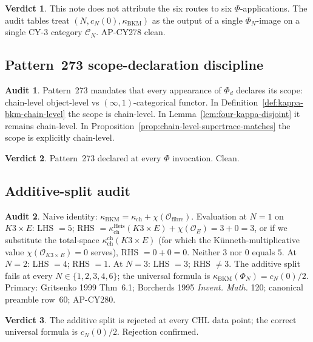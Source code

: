 \documentclass[11pt]{article}
\providecommand{\kBKM}{\kappa_{\mathrm{BKM}}}
\providecommand{\kch}{\kappa_{\mathrm{ch}}}
\theoremstyle{definition}
\newtheorem*{audit}{Audit}
\newtheorem*{verdict}{Verdict}
\begin{document}
\begin{verdict}
This note does not attribute the six routes to six $\Phi$-applications.
The audit tables treat $(N, c_N(0), \kBKM)$ as the output of a single
$\Phi_N$-image on a single CY-3 category $\mathcal C_N$.
AP-CY278 clean.
\end{verdict}

\subsection{Pattern~273 scope-declaration discipline}

\begin{audit}
Pattern~273 mandates that every appearance of $\Phi_d$ declares its
scope: chain-level object-level vs $(\infty,1)$-categorical functor.
In Definition~\ref{def:kappa-bkm-chain-level} the scope is
chain-level. In Lemma~\ref{lem:four-kappa-disjoint} it remains
chain-level. In Proposition~\ref{prop:chain-level-supertrace-matches}
the scope is explicitly chain-level.
\end{audit}

\begin{verdict}
Pattern~273 declared at every $\Phi$ invocation. Clean.
\end{verdict}

\subsection{Additive-split audit}
\label{sec:additive-split-audit}

\begin{audit}
Naive identity: $\kBKM = \kch + \chi(\mathcal O_{\mathrm{fibre}})$.
Evaluation at $N = 1$ on $K3 \times E$:
LHS $= 5$; RHS $= \kch^{\mathrm{Heis}}(K3 \times E) + \chi(\mathcal O_E)
= 3 + 0 = 3$, or if we substitute the total-space
$\kch^{\mathrm{ch}}(K3 \times E)$ (for which the K\"unneth-multiplicative
value $\chi(\mathcal O_{K3 \times E}) = 0$ serves),
RHS $= 0 + 0 = 0$. Neither $3$ nor $0$ equals $5$.
At $N = 2$: LHS $= 4$; RHS $= 1$.
At $N = 3$: LHS $= 3$; RHS $\ne 3$.
The additive split fails at every $N \in \{1, 2, 3, 4, 6\}$; the
universal formula is $\kBKM(\Phi_N) = c_N(0)/2$.
Primary: Gritsenko 1999 Thm~6.1; Borcherds 1995
\emph{Invent. Math.} 120; canonical preamble row~60; AP-CY280.
\end{audit}

\begin{verdict}
The additive split is rejected at every CHL data point; the correct
universal formula is $c_N(0)/2$. Rejection confirmed.
\end{verdict}
\end{document}

